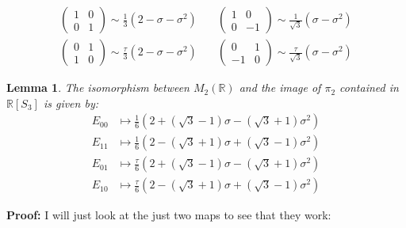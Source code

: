 \documentclass[a5paper]{article}
\renewcommand{\t}{\tau}
\newcommand{\s}{\sigma}
\newcommand{\R}{\mathbb{R}}
\newtheorem{lemma}{Lemma}
\begin{document}
\begin{align*}
\left(\begin{smallmatrix}1&0\\0&1\end{smallmatrix}\right) 
    \sim \frac{1}{3}(2 - \s - \s^2) &\quad
\left(\begin{smallmatrix}1&0\\0&-1\end{smallmatrix}\right) 
    \sim \frac{1}{\sqrt3}(\s - \s^2) \\
\left(\begin{smallmatrix}0&1\\1&0\end{smallmatrix}\right) 
    \sim \frac{\t}{3}(2 - \s - \s^2) &\quad
\left(\begin{smallmatrix}0&1\\-1&0\end{smallmatrix}\right) 
    \sim \frac{\t}{\sqrt3}(\s - \s^2)
\end{align*}

\begin{lemma}
    The isomorphism between $M_2(\R)$ and the image of $\pi_2$ contained in
    $\R[S_3]$ is given by:
    \begin{align*}
        E_{00} &\mapsto \frac{ 1}{6}\left(2 + (\sqrt 3 - 1)\s - (\sqrt 3 + 1) \s^2\right) \\
        E_{11} &\mapsto \frac{ 1}{6}\left(2 - (\sqrt 3 + 1)\s + (\sqrt 3 - 1) \s^2\right) \\
        E_{01} &\mapsto \frac{\t}{6}\left(2 + (\sqrt 3 - 1)\s - (\sqrt 3 + 1) \s^2\right) \\
        E_{10} &\mapsto \frac{\t}{6}\left(2 - (\sqrt 3 + 1)\s + (\sqrt 3 - 1) \s^2\right) 
    \end{align*}
\end{lemma}

\textbf{Proof:} I will just look at the just two maps to see that they work:
\end{document}
